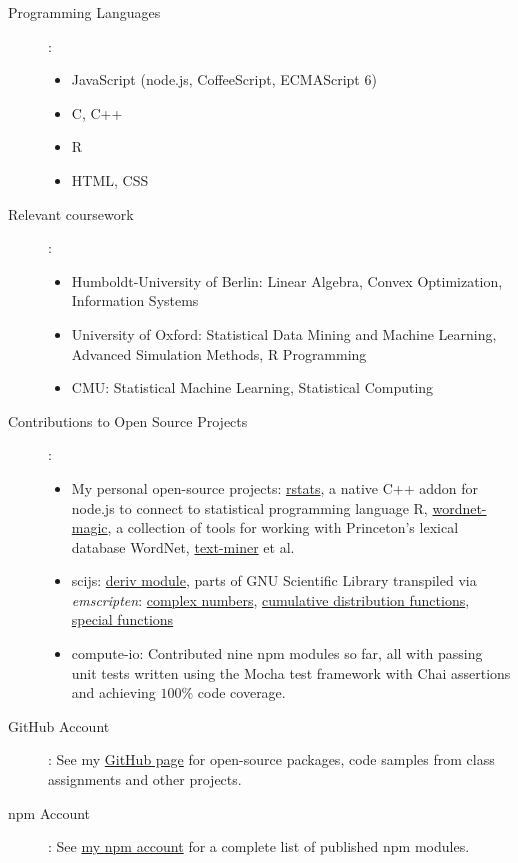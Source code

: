 \documentclass{scrartcl}
\begin{document}
\begin{description}
   \item [Programming Languages]:
   \begin{itemize}
   \item JavaScript (node.js, CoffeeScript, ECMAScript 6)
   \item C, C++
   \item R
   \item HTML, CSS
   \end{itemize}
   \item [Relevant coursework]:
   \begin{itemize}
   \item Humboldt-University of Berlin: Linear Algebra, Convex Optimization, Information Systems
   \item University of Oxford: Statistical Data Mining
and Machine Learning, Advanced Simulation Methods, R Programming
   \item CMU: Statistical Machine Learning, Statistical Computing 
   \end{itemize}
   \item [Contributions to Open Source Projects]: 
   \begin{itemize}
   \item My personal open-source projects: \href{https://github.com/Planeshifter/node-Rstats}{rstats}, a native C++ addon for node.js to connect to statistical programming language R, \href{https://github.com/Planeshifter/node-wordnet-magic}{wordnet-magic}, a collection of tools for working with Princeton's lexical database WordNet, \href{https://github.com/Planeshifter/text-miner}{text-miner} et al.
   \item scijs: \href{https://github.com/scijs/deriv}{deriv module}, parts of GNU Scientific Library transpiled via \emph{emscripten}: \href{https://github.com/scijs/gsl-complex}{complex numbers}, 
\href{https://github.com/scijs/gsl-cdf}{cumulative distribution functions},
\href{https://github.com/scijs/gsl-sf}{special functions}
   \item compute-io: Contributed nine npm modules so far, all with passing unit tests written using the Mocha test framework with Chai assertions and achieving $100\%$ code coverage.
   \end{itemize}
      \item [GitHub Account]: See my \href{https://github.com/Planeshifter}{GitHub page} for open-source packages, code samples from class assignments and other projects.
      \item [npm Account]: See \href{https://www.npmjs.com/~planeshifter}{my npm account} for a complete list of published npm modules.
\end{description}
\end{document}
